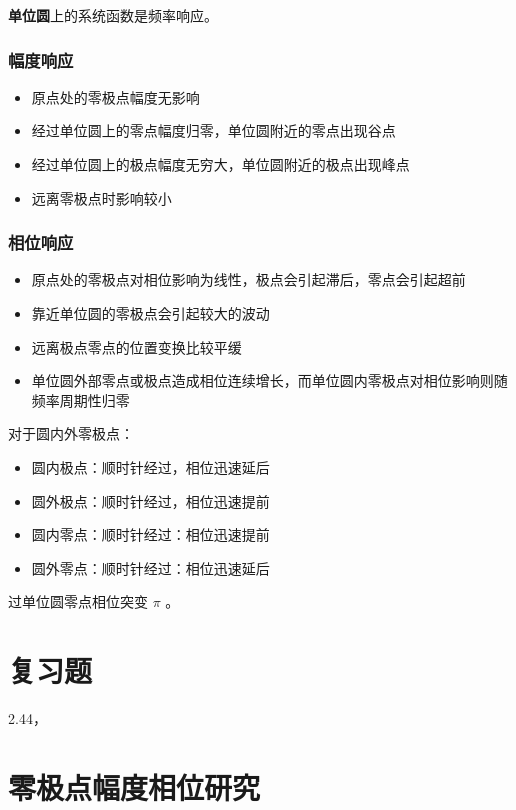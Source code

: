 \documentclass[cn,11pt,chinese,black,simple]{elegantbook}
\begin{document}
\textbf{单位圆}上的系统函数是频率响应。

\subsection{幅度响应}

\begin{itemize}
    \item 原点处的零极点幅度无影响
    \item 经过单位圆上的零点幅度归零，单位圆附近的零点出现谷点
    \item 经过单位圆上的极点幅度无穷大，单位圆附近的极点出现峰点
    \item 远离零极点时影响较小
\end{itemize}

\subsection{相位响应}

\begin{itemize}
    \item 原点处的零极点对相位影响为线性，极点会引起滞后，零点会引起超前
    \item 靠近单位圆的零极点会引起较大的波动
    \item 远离极点零点的位置变换比较平缓
    \item 单位圆外部零点或极点造成相位连续增长，而单位圆内零极点对相位影响则随频率周期性归零
\end{itemize}

对于圆内外零极点：

\begin{itemize}
    \item 圆内极点：顺时针经过，相位迅速延后
    \item 圆外极点：顺时针经过，相位迅速提前
    \item 圆内零点：顺时针经过：相位迅速提前
    \item 圆外零点：顺时针经过：相位迅速延后
\end{itemize}

过单位圆零点相位突变 \(\pi\) 。

\chapter{复习题}

2.44，

\appendix

\chapter{零极点幅度相位研究}



\let\chapname\undefined
\ifx\mainclass\undefined
\end{document}

